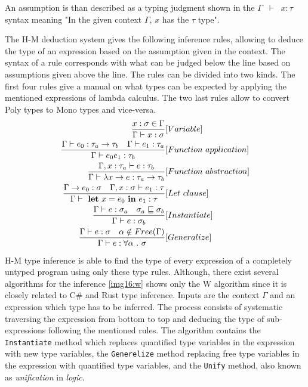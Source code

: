 An assumption is than described as a typing judgment shown in the \texttt{$\Gamma$ $\vdash$ $x:\tau$} syntax meaning "In the given context \texttt{$\Gamma$}, \texttt{$x$} has the \texttt{$\tau$} type".
\par
The H-M deduction system gives the following inference rules, allowing to deduce the type of an expression based on the assumption given in the context. 
The syntax of a rule corresponds with what can be judged below the line based on assumptions given above the line.
The rules can be divided into two kinds.
The first four rules give a manual on what types can be expected by applying the mentioned expressions of lambda calculus. 
The two last rules allow to convert Poly types to Mono types and vice-versa.
\begin{align*}
\frac{x : \sigma \in \Gamma}{\Gamma \vdash x : \sigma}&[Variable]\\
\frac{\Gamma \vdash e_0 : \tau_a \rightarrow \tau_b\ \ \ \Gamma \vdash e_1 : \tau_a}{\Gamma \vdash e_0 e_1 : \tau_b}&[Function\ application]\\
\frac{\Gamma, x : \tau_a \vdash e : \tau_b}{\Gamma \vdash \lambda x \rightarrow e : \tau_a \rightarrow \tau_b}&[Function\ abstraction]\\
\frac{\Gamma \rightarrow e_0 : \sigma \ \ \ \Gamma , x : \sigma \vdash e_1 : \tau}{\Gamma \vdash\ \text{\textbf{let}}\ x = e_0\ \text{\textbf{in}}\ e_1 : \tau}&[Let\ clause]\\
\frac{\Gamma \vdash e : \sigma_a \ \ \ \sigma_a \sqsubseteq \sigma_b}{\Gamma \vdash e : \sigma_b}&[Instantiate]\\
\frac{\Gamma \vdash e : \sigma \ \ \ \alpha \notin Free(\Gamma)}{\Gamma \vdash e : \forall \alpha\ .\ \sigma}&[Generalize]\\
\end{align*}
\par
H-M type inference is able to find the type of every expression of a completely untyped program using only these type rules.
Although, there exist several algorithms for the inference \ref{img16:w} shows only the W algorithm since it is closely related to C\# and Rust type inference.
Inputs are the context $\Gamma$ and an expression which type has to be inferred.
The process consists of systematic traversing the expression from bottom to top and deducing the type of sub-expressions following the mentioned rules.
The algorithm contains the \texttt{Instantiate} method which replaces quantified type variables in the expression with new type variables, the \texttt{Generelize} method replacing free type variables in the expression with quantified type variables, and the \texttt{Unify} method, also known as \textit{unification} in \textit{logic}.

